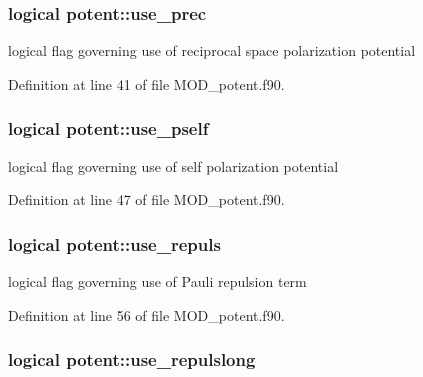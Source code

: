 \hypertarget{classpotent_a7dc24934e4ea98ba3cdfc54ab99b2d13}{
\subsubsection[{use\-\_\-prec}]{\setlength{\rightskip}{0pt plus 5cm}logical potent\-::use\-\_\-prec}}\label{classpotent_a7dc24934e4ea98ba3cdfc54ab99b2d13}


logical flag governing use of reciprocal space polarization potential 



Definition at line 41 of file M\-O\-D\-\_\-potent.\-f90.

\hypertarget{classpotent_aff1309d0a0e73e73c68e82900de2d4d4}{
\subsubsection[{use\-\_\-pself}]{\setlength{\rightskip}{0pt plus 5cm}logical potent\-::use\-\_\-pself}}\label{classpotent_aff1309d0a0e73e73c68e82900de2d4d4}


logical flag governing use of self polarization potential 



Definition at line 47 of file M\-O\-D\-\_\-potent.\-f90.

\hypertarget{classpotent_ad6d0ca7f83b5d630f4fed9837bf01d72}{
\subsubsection[{use\-\_\-repuls}]{\setlength{\rightskip}{0pt plus 5cm}logical potent\-::use\-\_\-repuls}}\label{classpotent_ad6d0ca7f83b5d630f4fed9837bf01d72}


logical flag governing use of Pauli repulsion term 



Definition at line 56 of file M\-O\-D\-\_\-potent.\-f90.

\hypertarget{classpotent_a3fc5cb2919b1f79f6d28865ee64941dd}{
\subsubsection[{use\-\_\-repulslong}]{\setlength{\rightskip}{0pt plus 5cm}logical potent\-::use\-\_\-repulslong}}\label{classpotent_a3fc5cb2919b1f79f6d28865ee64941dd}


